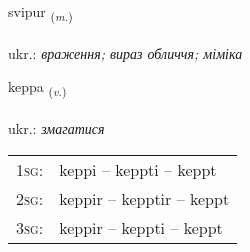 \documentclass[frontgrid, backgrid]{flacards}\usepackage[]{graphicx}\usepackage[]{xcolor}
\begin{document}
\renewcommand{\flhead}{\vskip5pt \fboxsep=0pt {\small\bfseries\footnotesize Nafnorð | іменник}}
\renewcommand{\fcfoot}{\vskip5pt \fboxsep=0pt \hspace{2pt}{\small\bfseries\footnotesize 2K}}

\renewcommand{\blhead}{\vskip5pt {\small\bfseries\footnotesize Nafnorð | іменник }}
\renewcommand{\bcfoot}{\vskip5pt \hspace{2pt}{\small\bfseries\footnotesize 2K}}


{svipur \small{\textsubscript{(\textit{m.})}} \\[1ex] %
\textphonetic{[svɪːpʏr]} \\
ukr.: \emph{враження; вираз обличчя; міміка} \\  [2ex]
\renewcommand*{\arraystretch}{0.8}
}

\renewcommand{\flhead}{\vskip5pt \fboxsep=0pt {\small\bfseries\footnotesize Sagnorð | дієслово}}
\renewcommand{\fcfoot}{\vskip5pt \fboxsep=0pt \hspace{2pt}{\small\bfseries\footnotesize 2K}}

\renewcommand{\blhead}{\vskip5pt {\small\bfseries\footnotesize Sagnorð | дієслово }}
\renewcommand{\bcfoot}{\vskip5pt \hspace{2pt}{\small\bfseries\footnotesize 2K}}


{keppa \small{\textsubscript{(\textit{v.})}} \\[1ex] %
\textphonetic{[cʰɛhpa]} \\
ukr.: \emph{змагатися} \\  [2ex]
\renewcommand*{\arraystretch}{0.8}
\begin{tabular}{p{1cm}l}
\textsc{1sg}: & keppi -- keppti -- keppt \\ 
\textsc{2sg}: & keppir -- kepptir -- keppt \\ 
\textsc{3sg}: & keppir -- keppti -- keppt \\ 
\end{tabular}
}
\end{document}

